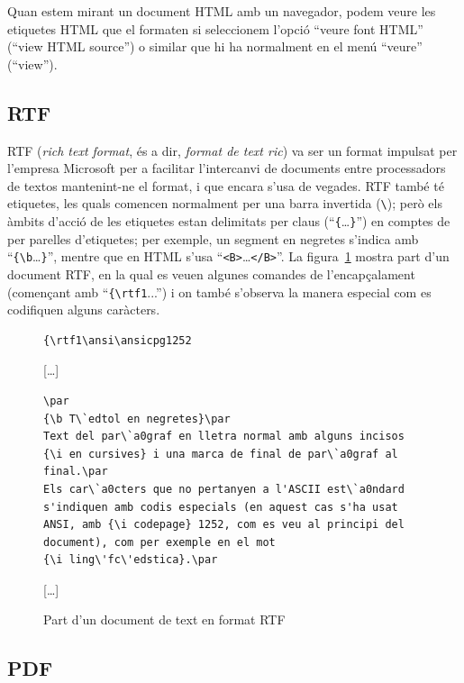 Quan estem mirant un document HTML amb un navegador, podem veure les etiquetes HTML que el formaten si seleccionem l'opció ``veure font
HTML'' (``view HTML source'') o similar que hi ha normalment en el
menú ``veure'' (``view'').

\subsection{RTF}
\label{s3:RTF}

RTF (\emph{rich text format}, és a dir, \emph{format de text ric}) va ser 
un format impulsat per l'empresa Microsoft per a facilitar
l'intercanvi de documents entre processadors de textos mantenint-ne el
format, i que encara s'usa de vegades. RTF també té etiquetes, les quals comencen normalment per una
barra invertida (\verb+\+); però els àmbits d'acció de les etiquetes
estan delimitats per claus (``\verb+{+\ldots\verb+}+'') en comptes de
per parelles d'etiquetes; per exemple, un segment en negretes s'indica
amb ``\verb+{\b+\ldots\verb+}+'', mentre que en HTML s'usa
``\verb+<B>+\ldots\verb+</B>+''. La figura~\ref{fg:RTF} mostra part
d'un document RTF, en la qual es veuen algunes comandes de
l'encapçalament (començant amb ``\verb+{\rtf1+...'') i on també
  s'observa la manera especial com es codifiquen alguns caràcters.

\begin{figure}
\begin{center}
\begin{verbatim}
{\rtf1\ansi\ansicpg1252
\end{verbatim}
[\ldots]
\begin{verbatim}
\par
{\b T\`edtol en negretes}\par
Text del par\`a0graf en lletra normal amb alguns incisos 
{\i en cursives} i una marca de final de par\`a0graf al 
final.\par  
Els car\`a0cters que no pertanyen a l'ASCII est\`a0ndard 
s'indiquen amb codis especials (en aquest cas s'ha usat 
ANSI, amb {\i codepage} 1252, com es veu al principi del 
document), com per exemple en el mot 
{\i ling\'fc\'edstica}.\par
\end{verbatim}
[\ldots]
\end{center}
\caption{Part d'un document de text en format RTF}
\label{fg:RTF}
\end{figure}


\subsection{PDF}

